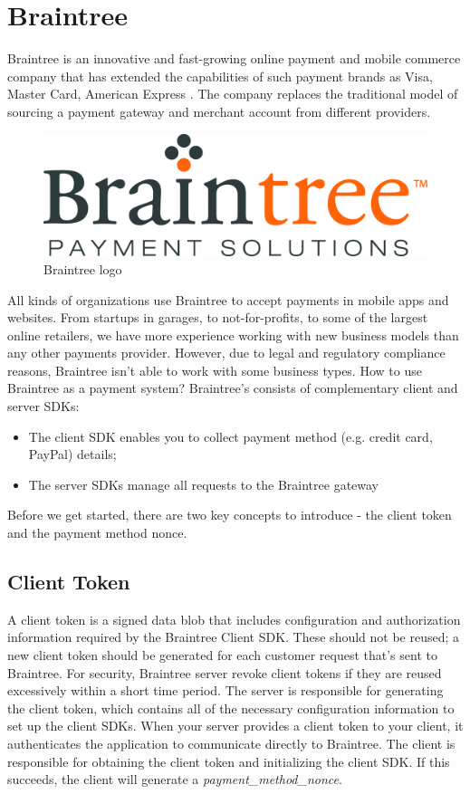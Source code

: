 \section{Braintree}
\label{sec:braintree}
Braintree is an innovative and fast-growing online payment and mobile commerce company that has extended the capabilities of such payment brands as Visa, Master Card, American Express \cite{braintree_docs}.
The company replaces the traditional model of sourcing a payment gateway and merchant account from different providers.
\begin{figure}[htb]
\centering
\includegraphics[width=0.5\linewidth]{images/chapter2/braintree-logo.jpg}\hfill
\caption[Braintree logo]{Braintree logo}
\label{fig:stripe_logo}
\end{figure}
All kinds of organizations use Braintree to accept payments in mobile apps and websites. From startups in garages, to not-for-profits, to some of the largest online retailers, we have more experience working with new business models than any other payments provider. However, due to legal and regulatory compliance reasons, Braintree isn't able to work with some business types. How to use Braintree as a payment system?
Braintree's  consists of complementary client and server SDKs:
\begin{itemize}
\item The client SDK enables you to collect payment method (e.g. credit card, PayPal) details;
\item The server SDKs manage all requests to the Braintree gateway
\end{itemize}
Before we get started, there are two key concepts to introduce - the client token and the payment method nonce.
\subsection{Client Token}
A client token is a signed data blob that includes configuration and authorization information required by the Braintree Client SDK. These should not be reused; a new client token should be generated for each customer request that's sent to Braintree. For security, Braintree server revoke client tokens if they are reused excessively within a short time period.
\newline
The server is responsible for generating the client token, which contains all of the necessary configuration information to set up the client SDKs. When your server provides a client token to your client, it authenticates the application to communicate directly to Braintree.
\newline
The client is responsible for obtaining the client token and initializing the client SDK. If this succeeds, the client will generate a \emph{payment\_method\_nonce}.
